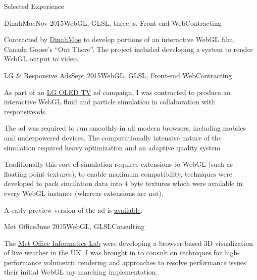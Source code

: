 \documentclass{resume} %
\begin{document}
\begin{rSection}{Selected Experience}
\begin{rSubsection}{DinahMoe}{Nov 2015}{WebGL, GLSL, three.js, Front-end Web}{Contracting}
\item Contracted by \href{http://dinahmoe.com/}{DinahMoe} to develop portions of an interactive WebGL film, Canada Goose's ``Out There''. The project included developing a system to render WebGL output to video.
\end{rSubsection}

\begin{rSubsection}{LG \& Responsive Ads}{Sept 2015}{WebGL, GLSL, Front-end Web}{Contracting}
\item As part of an \href{http://www.lg.com/uk/oled-tv}{LG OLED TV} ad campaign, I was contracted to produce an interactive WebGL fluid and particle simulation in collaboration with \href{http://www.responsiveads.com/}{responsiveads}.
\item The ad was required to run smoothly in all modern browsers, including mobiles and underpowered devices. The computationally intensive nature of the simulation required heavy optimization and an adaptive quality system.
\item Traditionally this sort of simulation requires extensions to WebGL (such as floating point textures), to enable maximum compatibility, techniques were developed to pack simulation data into 4 byte textures which were available in every WebGL instance (whereas extensions are not).
\item A early preview version of the ad is \href{http://haxiomic.github.io/ig783wghhnod/new-brush/}{available}.
\end{rSubsection}

\begin{rSubsection}{Met Office}{June 2015}{WebGL, GLSL}{Consulting}
\item The \href{http://www.informaticslab.co.uk/}{Met Office Informatics Lab} were developing a browser-based 3D visualization of live weather in the UK. I was brought in to consult on techniques for high-performance volumetric rendering and approaches to resolve performance issues their initial WebGL ray marching implementation.
\end{rSubsection}


\end{rSection}
\end{document}
